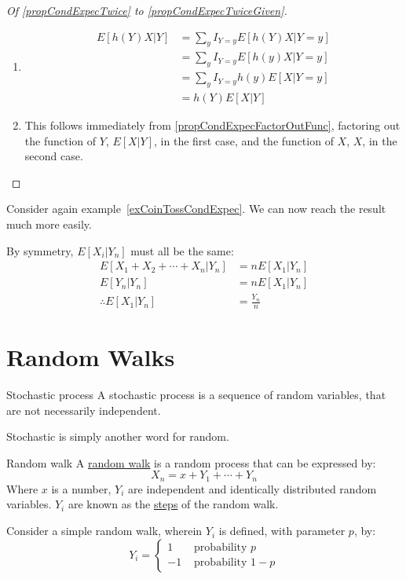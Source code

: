 \documentclass[../Main.tex]{subfiles}
\begin{document}
\begin{proof}[Of \ref{propCondExpecTwice} to \ref{propCondExpecTwiceGiven}]
\begin{enumerate}
        \item \begin{align*}
                E[h(Y) X | Y] &= \sum_y I_{Y = y} E[h(Y) X | Y = y] \\
                &= \sum_y I_{Y = y} E[h(y) X | Y = y] \\
                &= \sum_y I_{Y = y} h(y) E[X | Y = y] \\
                &= h(Y) E[X | Y]
            \end{align*}
        \item This follows immediately from \ref{propCondExpecFactorOutFunc}, factoring out the function of $Y$, $E[X | Y]$, in the first case, and the function of $X$, $X$, in the second case.
    \end{enumerate}
\end{proof}
\begin{example}
    Consider again example~\ref{exCoinTossCondExpec}. We can now reach the result much more easily.\par
    By symmetry, $E[X_i | Y_n]$ must all be the same:
    \begin{align*}
        E[X_1 + X_2 + \cdots + X_n | Y_n] &= n E[X_1 | Y_n] \\
        E[Y_n | Y_n] &= n E[X_1 | Y_n] \\
        \therefore E[X_1 | Y_n] &= \frac{Y_n}{n}
    \end{align*}
\end{example}
\section{Random Walks}
\begin{definition}{Stochastic process}
    A stochastic process is a sequence of random variables, that are not necessarily independent.    
\end{definition}
Stochastic is simply another word for random.
\begin{definition}{Random walk}
    A \underline{random walk} is a random process that can be expressed by:
    \begin{equation*}
        X_n = x + Y_1 + \cdots + Y_n
    \end{equation*}
    Where $x$ is a number, $Y_i$ are independent and identically distributed random variables. $Y_i$ are known as the \underline{steps} of the random walk.
\end{definition}
Consider a simple random walk, wherein $Y_i$ is defined, with parameter $p$, by:
\begin{equation*}
    Y_i =
    \begin{cases}
        1 & \text{ probability } p \\
        -1 & \text{ probability } 1-p
    \end{cases}
\end{equation*}
\end{document}
